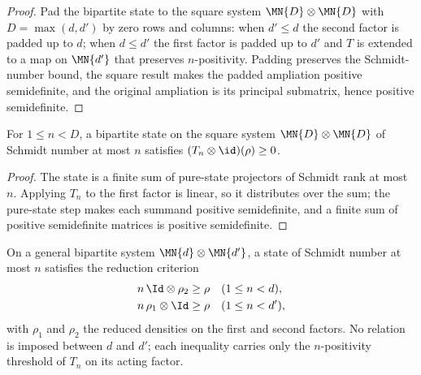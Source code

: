 \begin{proof}
    \leanok
    Pad the bipartite state to the square system $\MN{D}\otimes\MN{D}$ with
    $D=\max(d,d')$ by zero rows and columns: when $d'\le d$ the second factor is padded
    up to $d$; when $d\le d'$ the first factor is padded up to $d'$ and $T$ is extended
    to a map on $\MN{d'}$ that preserves $n$-positivity. Padding preserves the
    Schmidt-number bound, the square result makes the padded ampliation positive
    semidefinite, and the original ampliation is its principal submatrix, hence positive
    semidefinite.
\end{proof}

\begin{theorem}
    \label{thm:has_schmidt_number_le_tensor_map_id_t_eta}
    \leanok
    For $1\le n<D$, a bipartite state on the square system
    $\MN{D}\otimes\MN{D}$ of Schmidt number at most $n$ satisfies
    $(T_n\otimes\id)(\rho)\ge 0$.
\end{theorem}

\begin{proof}
    \leanok
    The state is a finite sum of pure-state projectors of Schmidt rank at most $n$.
    Applying $T_n$ to the first factor is linear, so it distributes over the sum; the
    pure-state step makes each summand positive semidefinite, and a finite sum of
    positive semidefinite matrices is positive semidefinite.
\end{proof}

\begin{theorem}
    \label{thm:reduction_criterion_of_schmidt_number}
    \leanok
    On a general bipartite system $\MN{d}\otimes\MN{d'}$, a state of Schmidt number at
    most $n$ satisfies the reduction criterion
    \begin{align}
        n\,\Id\otimes\rho_2 & \ge\rho
                            &         & (1\le n<d),
        \notag                                       \\
        n\,\rho_1\otimes\Id & \ge\rho
                            &         & (1\le n<d'),
        \notag
    \end{align}
    with $\rho_1$ and $\rho_2$ the reduced densities on the first and second factors.
    No relation is imposed between $d$ and $d'$; each inequality carries only the
    $n$-positivity threshold of $T_n$ on its acting factor.
\end{theorem}


